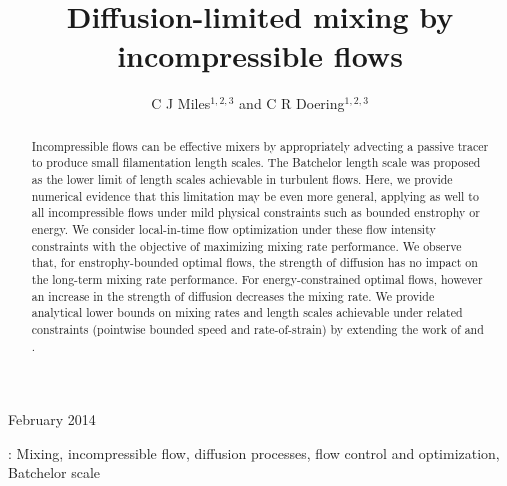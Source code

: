 \documentclass[12pt]{iopart}
\begin{document}
\title[Diffusion-limited mixing by incompressible flows]{Diffusion-limited mixing by incompressible flows}

\author{C J Miles$^{1,2,3}$ and C R Doering$^{1,2,3}$ }

\address{$^1$ Department of Physics, University of Michigan,
Ann Arbor, MI 48104-1040, USA}
\address{$^2$ Department of Mathematics, University of Michigan,
Ann Arbor, MI 48104-1043, USA}
\address{$^3$ Center for the Study of Complex Systems, University of Michigan,
Ann Arbor, MI 48104-1107, USA}
\vspace{10pt}
\begin{indented}
\item[]February 2014
\end{indented}

\begin{abstract}
Incompressible flows can be effective mixers by appropriately advecting a passive tracer to produce small filamentation length scales. The Batchelor length scale \cite{Batchelor1959a} was proposed as the lower limit of length scales achievable in turbulent flows. Here, we provide numerical evidence that this limitation may be even more general, applying as well to all incompressible flows under mild physical constraints such as bounded enstrophy or energy. We consider local-in-time flow optimization under these flow intensity constraints with the objective of maximizing mixing rate performance. We observe that, for enstrophy-bounded optimal flows, the strength of diffusion has no impact on the long-term mixing rate performance. For energy-constrained optimal flows, however an increase in the strength of diffusion decreases the mixing rate. We provide analytical lower bounds on mixing rates and length scales achievable under related constraints (pointwise bounded speed and rate-of-strain) by extending the work of \cite{JFM2011} and \cite{Chi-Cheu1996}. 

\end{abstract}
%
%
\vspace{2pc}
: Mixing, incompressible flow, diffusion processes, flow control and optimization, Batchelor scale

\submitto{\NL}
%
% 
%
\end{document}
